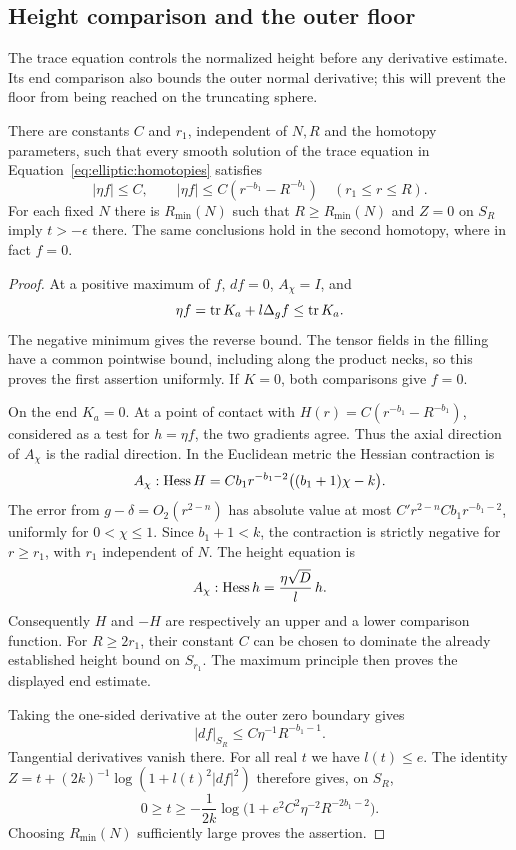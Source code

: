 \subsection{Height comparison and the outer floor}

The trace equation controls the normalized height before any derivative
estimate.  Its end comparison also bounds the outer normal derivative;
this will prevent the floor from being reached on the truncating sphere.

\begin{lemma}\label{lem:elliptic:height}
There are constants $C$ and $r_1$, independent of $N,R$ and the homotopy
parameters, such that every smooth solution of the trace equation in
Equation~\eqref{eq:elliptic:homotopies} satisfies
\[
 |\eta f|\le C,\qquad
 |\eta f|\le C(r^{-b_1}-R^{-b_1})\quad(r_1\le r\le R).
\]
For each fixed $N$ there is $R_{\min}(N)$ such that $R\ge R_{\min}(N)$
and $Z=0$ on $S_R$ imply $t>-\epsilon$ there.  The same conclusions
hold in the second homotopy, where in fact $f=0$.
\end{lemma}

\begin{proof}
At a positive maximum of $f$, $df=0$, $A_\chi=I$, and
\[
 \eta f=\operatorname{tr} K_a+l\Delta_g f\le \operatorname{tr} K_a.
\]
The negative minimum gives the reverse bound.  The tensor fields in
the filling have a common pointwise bound, including along the product
necks, so this proves the first assertion uniformly.  If $K=0$, both
comparisons give $f=0$.

On the end $K_a=0$.  At a point of contact with
$H(r)=C(r^{-b_1}-R^{-b_1})$, considered as a test for $h=\eta f$, the
two gradients agree.  Thus the axial direction of $A_\chi$ is the
radial direction.  In the Euclidean metric the Hessian contraction is
\[
 A_\chi:\operatorname{Hess} H
 =Cb_1r^{-b_1-2}\big((b_1+1)\chi-k\big).
\]
The error from $g-\delta=O_2(r^{2-n})$ has absolute value at most
$C' r^{2-n}Cb_1r^{-b_1-2}$, uniformly for $0<\chi\le1$.
Since $b_1+1<k$, the contraction is strictly negative for $r\ge r_1$,
with $r_1$ independent of $N$.  The height equation is
\[
 A_\chi:\operatorname{Hess} h
   =\frac{\eta\sqrt D}{l}\,h.
\]
Consequently $H$ and $-H$ are respectively an upper and a lower
comparison function.  For $R\ge2r_1$, their constant $C$ can be chosen
to dominate the already established height bound on $S_{r_1}$.
The maximum principle then proves the displayed end estimate.

Taking the one-sided derivative at the outer zero boundary gives
\begin{equation}\label{eq:elliptic:outer-gradient}
 |df|_{S_R}\le C\eta^{-1}R^{-b_1-1}.
\end{equation}
Tangential derivatives vanish there.  For all real $t$ we have $l(t)\le e$.
The identity $Z=t+(2k)^{-1}\log(1+l(t)^2|df|^2)$ therefore gives, on
$S_R$,
\[
 0\ge t\ge-\frac1{2k}
       \log\bigl(1+e^2C^2\eta^{-2}R^{-2b_1-2}\bigr).
\]
Choosing $R_{\min}(N)$ sufficiently large proves the assertion.
\end{proof}

